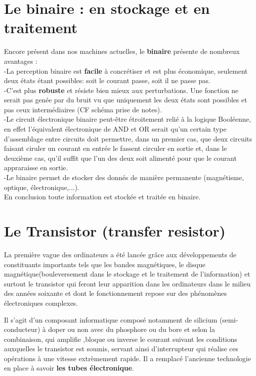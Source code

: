 \documentclass{report}
\begin{document}
\section{Le binaire : en stockage et en traitement}

Encore présent dans nos machines actuelles, le {\bf binaire} présente de nombreux avantages : \\
-La perception binaire est {\bf facile} à concrétiser et est plus économique, seulement deux états étant possibles: soit le courant passe, soit il ne passe pas. \\
-C'est plus {\bf robuste} et résiste bien mieux aux perturbations. Une fonction ne serait pas genée par du bruit vu que uniquement les deux états sont possibles et pas ceux intermédiaires (CF schéma prise de notes).\\
-Le circuit électronique binaire peut-être étroitement relié à la logique Booléenne, en effet l'équivalent électronique de AND et OR serait qu'un certain type d'assemblage entre circuits doit permettre, dans un premier cas, que deux circuits faisant ciruler un courant en entrée le fassent circuler en sortie et, dans le deuxième cas, qu'il suffit que l'un des deux soit alimenté pour que le courant appraraisse en sortie.\\
-Le binaire permet de stocker des donnés de manière permanente (magnétisme, optique, électronique,...).\\

En conclusion toute information est stockée et traitée en binaire.

\section{Le Transistor (transfer resistor)}
La première vague des ordinateurs a été lancée grâce aux développements de constituants importants tels que les bandes magnétiques, le disque magnétique(bouleversement dans le stockage et le traitement de l'information) et surtout le transistor qui feront leur apparition dans les ordinateurs dans le milieu des années soixante et dont le fonctionnement repose sur des phénomènes électroniques complexes.

Il s'agit d'un composant informatique composé notamment de silicium (semi-conducteur) à doper ou non avec du phosphore ou du bore et selon la combinaison, qui amplifie ,bloque ou inverse le courant suivant les conditions auxquelles le transistor est soumis, servant ainsi d'interrupteur qui réalise ces opérations à une vitesse extrèmement rapide. Il a remplacé l'ancienne technologie en place à savoir {\bf les tubes électronique}.
\end{document}
